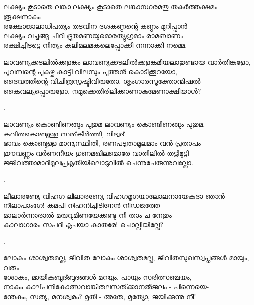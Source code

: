 \begin{enumerate}

\begin{slokam}{\VSr}{\VenM}{ലക്ഷ്യം കൂടാതെ ലങ്കാ}
 ലക്ഷ്യം കൂടാതെ ലങ്കാനഗരമതു തകർത്തക്ഷമം രൂക്ഷനാകും\\
രക്ഷോജാലാധിപത്യം തടവിന ദശകണ്ഠന്റെ കണ്ഠം മുറിപ്പാൻ\\
ലക്ഷ്യം വച്ചങ്ങു ചീറി ദ്രുതമണയുമൊരത്യുഗ്രമാം രാമബാണം\\
രക്ഷിച്ചീടട്ടെ നിത്യം കലിമലമകലെപ്പോക്കി നന്നാക്കി നമ്മെ.
\end{slokam}


\begin{slokam}{\VSv}{\VNM}{ലാവണ്യക്കടലിൽക്കളങ്കം}
 ലാവണ്യക്കടലിൽക്കളങ്കമിയലാതുണ്ടായ വാർതിങ്കളോ,\\
പൂവമ്പന്റെ പുകഴ്ച കാട്ടി വിലസും പുത്തൻ കൊടിക്കൂറയോ,\\
ദൈവത്തിന്റെ വിചിത്രസൃഷ്ടിവിരുതോ, ശൃംഗാരസൂക്തോന്മിഷൽ-\\
കൈവല്യപ്പൊരുളോ, നമുക്കെതിരിലിക്കാണാകുമേണാക്ഷിയാള്‍?
\end{slokam}


.


\begin{slokam}{\VSr}{\VCBP}{ലാവണ്യം കൊണ്ടിണങ്ങും പുതുമ}
ലാവണ്യം കൊണ്ടിണങ്ങും പുതുമ, കവിതകൊണ്ടുള്ള സത്‌കീർത്തി, വിദ്വദ്‌-\\
ഭാവം കൊണ്ടുള്ള മാന്യസ്ഥിതി, രണപടുതാമൂലമാം വൻ പ്രതാപം\\
ഈവണ്ണം വർണനീയം ഗുണമഖിലമൊരേ വാതിലിൽ തട്ടിമുട്ടി-\\
ജ്ജീവത്താമാദിമൂലപ്രകൃതിയിലൊടുവിൽ ചെന്നുചേരുന്നുവല്ലോ.
\end{slokam}


.


\begin{slokam}{\VMk}{\KV}{ലീലാരണ്യേ വിഹഗ}
ലീലാരണ്യേ വിഹഗമൃഗയാലോലനായേകദാ ഞാൻ\\
നീലാപാംഗേ! കമപി നിഹനിച്ചീടിനേൻ നീഡജത്തേ\\
മാലാർന്നാരാൽ മരുവുമിണയേക്ക​ണ്ടു നീ താം ച നേതും\\
കാലാഗാരം സപദി കൃപയാ കാതരേ! ചൊല്ലിയില്ലേ?
\end{slokam}


.


\begin{slokam}{\VSv}{\CKP}{ലോകം ശാശ്വതമല്ല, ജീവിത}
 ലോകം ശാശ്വതമല്ല, ജീവിതസുഖസ്വപ്നങ്ങള്‍ മായും, വരും\\
ശോകം, മായികബുദ്ബുദങ്ങള്‍ മറയും, പായും സരിത്സഞ്ചയം,\\
നാകം കാല്‌പനികോത്സവാങ്കിതലസത്ക്കാനൽജലം - പിന്നെയെ-\\
ന്തേകം, സത്യ, മനശ്വരം? മൃതി - അതേ, മൃത്യോ, ജയിക്കുന്നു നീ!
\end{slokam}


\end{enumerate}
